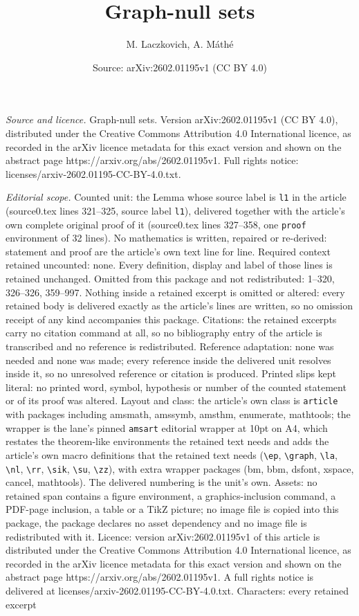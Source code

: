 \documentclass[10pt,a4paper]{amsart}
\title[Graph-null sets]{Graph-null sets}
\author{M. Laczkovich, A. M\'ath\'e}
\date{Source: arXiv:2602.01195v1 (CC BY 4.0)}
\begin{document}
\maketitle

\noindent\emph{Source and licence.} Graph-null sets. Version arXiv:2602.01195v1 (CC BY 4.0), distributed under the Creative Commons Attribution 4.0 International licence, as recorded in the arXiv licence metadata for this exact version and shown on the abstract page https://arxiv.org/abs/2602.01195v1. Full rights notice: licenses/arxiv-2602.01195-CC-BY-4.0.txt.\par\smallskip

\noindent\textit{Editorial scope.} Counted unit: the Lemma whose source label is \texttt{l1} in the article (source0.tex lines 321--325, source label \texttt{l1}), delivered together with the article's own complete original proof of it (source0.tex lines 327--358, one \texttt{proof} environment of 32 lines). No mathematics is written, repaired or re-derived: statement and proof are the article's own text line for line. Required context retained uncounted: none. Every definition, display and label of those lines is retained unchanged. Omitted from this package and not redistributed: 1--320, 326--326, 359--997. Nothing inside a retained excerpt is omitted or altered: every retained body is delivered exactly as the article's lines are written, so no omission receipt of any kind accompanies this package. Citations: the retained excerpts carry no citation command at all, so no bibliography entry of the article is transcribed and no reference is redistributed. Reference adaptation: none was needed and none was made; every reference inside the delivered unit resolves inside it, so no unresolved reference or citation is produced. Printed slips kept literal: no printed word, symbol, hypothesis or number of the counted statement or of its proof was altered. Layout and class: the article's own class is \texttt{article} with packages including amsmath, amssymb, amsthm, enumerate, mathtools; the wrapper is the lane's pinned \texttt{amsart} editorial wrapper at 10pt on A4, which restates the theorem-like environments the retained text needs and adds the article's own macro definitions that the retained text needs (\texttt{\textbackslash ep}, \texttt{\textbackslash graph}, \texttt{\textbackslash la}, \texttt{\textbackslash nl}, \texttt{\textbackslash rr}, \texttt{\textbackslash sik}, \texttt{\textbackslash su}, \texttt{\textbackslash zz}), with extra wrapper packages (bm, bbm, dsfont, xspace, cancel, mathtools). The delivered numbering is the unit's own. Assets: no retained span contains a figure environment, a graphics-inclusion command, a PDF-page inclusion, a table or a TikZ picture; no image file is copied into this package, the package declares no asset dependency and no image file is redistributed with it. Licence: version arXiv:2602.01195v1 of this article is distributed under the Creative Commons Attribution 4.0 International licence, as recorded in the arXiv licence metadata for this exact version and shown on the abstract page https://arxiv.org/abs/2602.01195v1. A full rights notice is delivered at licenses/arxiv-2602.01195-CC-BY-4.0.txt. Characters: every retained excerpt 
\end{document}
